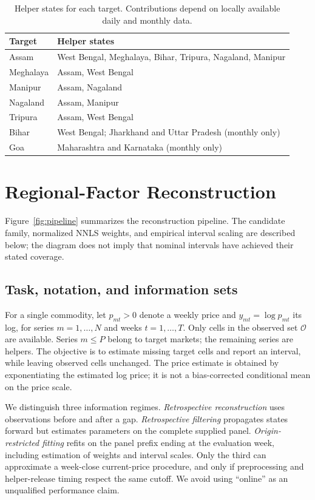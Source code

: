 \documentclass[sigconf,nonacm,balance=false]{acmart}
\begin{document}
\begin{table}[tbp]
\caption{Helper states for each target. Contributions depend on locally available daily and monthly data.}
\label{tab:helpers}
\small
\begin{tabular}{lp{5.1cm}}
\toprule
Target & Helper states \\
\midrule
Assam & West Bengal, Meghalaya, Bihar, Tripura, Nagaland, Manipur \\
Meghalaya & Assam, West Bengal \\
Manipur & Assam, Nagaland \\
Nagaland & Assam, Manipur \\
Tripura & Assam, West Bengal \\
Bihar & West Bengal; Jharkhand and Uttar Pradesh (monthly only) \\
Goa & Maharashtra and Karnataka (monthly only) \\
\bottomrule
\end{tabular}
\end{table}

\section{Regional-Factor Reconstruction}\label{sec:method}

Figure~\ref{fig:pipeline} summarizes the reconstruction pipeline. The candidate family, normalized NNLS weights, and empirical interval scaling are described below; the diagram does not imply that nominal intervals have achieved their stated coverage.


\subsection{Task, notation, and information sets}

For a single commodity, let $p_{mt}>0$ denote a weekly price and $y_{mt}=\log p_{mt}$ its log, for series $m=1,\ldots,N$ and weeks $t=1,\ldots,T$. Only cells in the observed set $\mathcal O$ are available. Series $m\le P$ belong to target markets; the remaining series are helpers. The objective is to estimate missing target cells and report an interval, while leaving observed cells unchanged. The price estimate is obtained by exponentiating the estimated log price; it is not a bias-corrected conditional mean on the price scale.

We distinguish three information regimes. \emph{Retrospective reconstruction} uses observations before and after a gap. \emph{Retrospective filtering} propagates states forward but estimates parameters on the complete supplied panel. \emph{Origin-restricted fitting} refits on the panel prefix ending at the evaluation week, including estimation of weights and interval scales. Only the third can approximate a week-close current-price procedure, and only if preprocessing and helper-release timing respect the same cutoff. We avoid using ``online'' as an unqualified performance claim.
\end{document}
